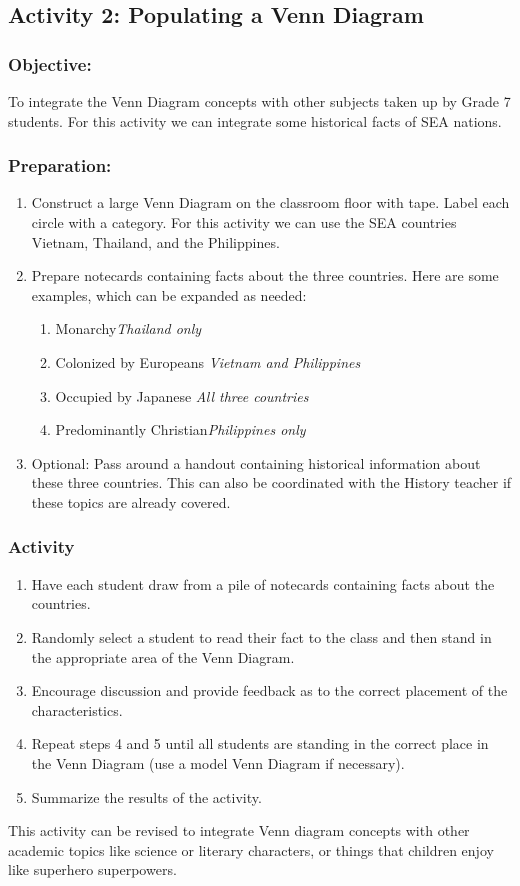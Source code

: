\subsection*{Activity 2: Populating a Venn Diagram}
\subsubsection*{Objective:}
 To integrate the Venn Diagram concepts with other subjects taken up by Grade 7 students. For this activity we can integrate some historical facts of SEA nations.

\subsubsection*{Preparation:}
\begin{enumerate}
\item Construct a large Venn Diagram on the classroom floor with tape. Label each circle with a category. For this activity we can use the SEA countries Vietnam, Thailand, and the Philippines.
\item Prepare notecards containing facts about the three countries. Here are some examples, which can be expanded as needed:
\begin{enumerate}
\item Monarchy\hfil	\textit{Thailand only}
\item Colonized by Europeans \hfil		\textit{Vietnam and Philippines}
\item Occupied by Japanese \hfil	\textit{All three countries}
\item Predominantly Christian\hfil \textit{Philippines only}

\end{enumerate}
\item Optional: Pass around a handout containing historical information about these three countries. This can also be coordinated with the History teacher if these topics are already covered.
\end{enumerate}

\subsubsection*{Activity}
\begin{enumerate}
\item Have each student draw from a pile of notecards containing facts about the countries.
\item Randomly select a student to read their fact to the class and then stand in the appropriate area of the Venn Diagram. 
\item Encourage discussion and provide feedback as to the correct placement of the characteristics.
\item Repeat steps 4 and 5 until all students are standing in the correct place in the Venn Diagram (use a model Venn Diagram if necessary).
\item Summarize the results of the activity.
\end{enumerate}
This activity can be revised to integrate Venn diagram concepts with other academic topics like science or literary characters, or things that children enjoy like superhero superpowers.

